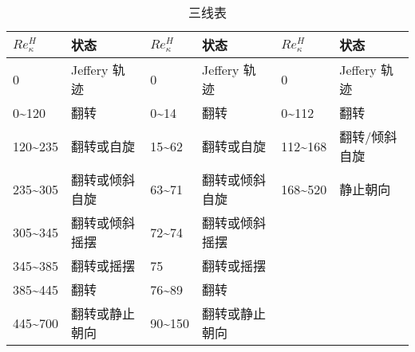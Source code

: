 \begin{table}
	\centering
	\begin{threeparttable}[c]
		\caption{三线表}
		\label{tab:ch1-part-rotate}
		\begin{tabular}{llllll}
			\toprule
			$Re_\kappa^H$                      & 状态         & $Re_\kappa^H$                     & 状态      & $Re_\kappa^H$                     & 状态       \\
			\midrule
			0                       & Jeffery 轨迹 & 0                      & Jeffery 轨迹 &0&Jeffery 轨迹 \\
			0\textasciitilde{}120   & 翻转         & 0\textasciitilde{}14   & 翻转          &0\textasciitilde{}112& 翻转\\
			120\textasciitilde{}235 & 翻转或自旋      & 15\textasciitilde{}62  & 翻转或自旋  &112\textasciitilde{}168 & 翻转/倾斜自旋      \\
			235\textasciitilde{}305 & 翻转或倾斜自旋    & 63\textasciitilde{}71  & 翻转或倾斜自旋& 168\textasciitilde{}520 & 静止朝向         \\
			305\textasciitilde{}345 & 翻转或倾斜摇摆    & 72\textasciitilde{}74  & 翻转或倾斜摇摆 & &   \\
			345\textasciitilde{}385 & 翻转或摇摆      & 75                     & 翻转或摇摆       & &\\
			385\textasciitilde{}445 & 翻转         & 76\textasciitilde{}89  & 翻转          & &\\
			445\textasciitilde{}700 & 翻转或静止朝向    & 90\textasciitilde{}150 & 翻转或静止朝向  & &\\
			\bottomrule  
		\end{tabular}
	\end{threeparttable}
\end{table}